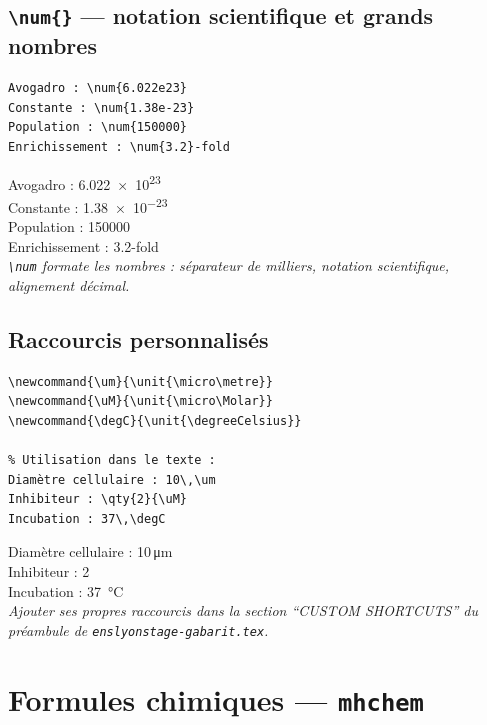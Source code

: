 \documentclass[12pt, a4paper]{article}
\begin{document}
\subsection{\texttt{\textbackslash num\{\}} — notation scientifique et grands nombres}

\begin{demo}
\begin{lstlisting}[style=latexcode]
Avogadro : \num{6.022e23}
Constante : \num{1.38e-23}
Population : \num{150000}
Enrichissement : \num{3.2}-fold
\end{lstlisting}
\tcblower
Avogadro : \num{6.022e23}\\
Constante : \num{1.38e-23}\\
Population : \num{150000}\\
Enrichissement : \num{3.2}-fold\\[6pt]
{\footnotesize\itshape \texttt{\textbackslash num} formate les nombres : séparateur de milliers, notation scientifique, alignement décimal.}
\end{demo}

\newpage

\subsection{Raccourcis personnalisés}

\begin{demo}
\begin{lstlisting}[style=latexcode]
% Définis dans le préambule de enslyonstage-gabarit.tex :
\newcommand{\um}{\unit{\micro\metre}}
\newcommand{\uM}{\unit{\micro\Molar}}
\newcommand{\degC}{\unit{\degreeCelsius}}

% Utilisation dans le texte :
Diamètre cellulaire : 10\,\um
Inhibiteur : \qty{2}{\uM}
Incubation : 37\,\degC
\end{lstlisting}
\tcblower
Diamètre cellulaire : 10\,\unit{\micro\metre}\\
Inhibiteur : \qty{2}{\micro\Molar}\\
Incubation : \qty{37}{\degreeCelsius}\\[8pt]
{\footnotesize\itshape Ajouter ses propres raccourcis dans la section ``CUSTOM SHORTCUTS'' du préambule de \texttt{enslyonstage-gabarit.tex}.}
\end{demo}

\section{Formules chimiques — \texttt{mhchem}}
\end{document}
